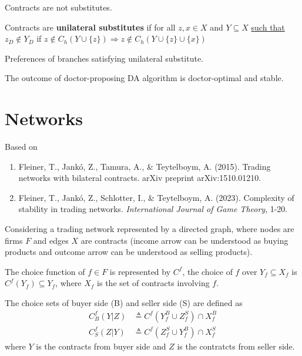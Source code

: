 \documentclass[11pt]{elegantbook}
\begin{document}
\begin{remark}
    Contracts are not substitutes.
\end{remark}

\begin{definition}
    \normalfont
    Contracts are \textbf{unilateral substitutes} if for all $z,x\in X$ and $Y\subseteq X$ \underline{such that $z_D\notin Y_D$} if $z\notin C_h(Y\cup\{z\}) \Rightarrow z\notin C_h(Y\cup\{z\}\cup\{x\})$
\end{definition}

\begin{remark}
    Preferences of branches satisfying unilateral substitute.
\end{remark}

\begin{remark}
    The outcome of doctor-proposing DA algorithm is doctor-optimal and stable.
\end{remark}

\section{Networks}
Based on
\begin{enumerate}[$\circ$]
    \item Fleiner, T., Jankó, Z., Tamura, A., \& Teytelboym, A. (2015). Trading networks with bilateral contracts. arXiv preprint arXiv:1510.01210.
    \item Fleiner, T., Jankó, Z., Schlotter, I., \& Teytelboym, A. (2023). Complexity of stability in trading networks. \textit{International Journal of Game Theory}, 1-20.
\end{enumerate}

Considering a trading network represented by a directed graph, where nodes are firms $F$ and edges $X$ are contracts (income arrow can be understood as buying products and outcome arrow can be understood as selling products).

The choice function of $f\in F$ is represented by $C^f$, the choice of $f$ over $Y_f\subseteq X_f$ is $C^f(Y_f)\subseteq Y_f$, where $X_f$ is the set of contracts involving $f$.

The choice sets of buyer side (B) and seller side (S) are defined as
\begin{equation}
    \begin{aligned}
        C_B^f(Y|Z)&\triangleq C^f(Y_f^B\cup Z_f^S)\cap X_f^B\\
        C_S^f(Z|Y)&\triangleq C^f(Z_f^S\cup Y_f^B)\cap X_f^S
    \end{aligned}
    \nonumber
\end{equation}
where $Y$ is the contracts from buyer side and $Z$ is the contratcts from seller side.
\end{document}
